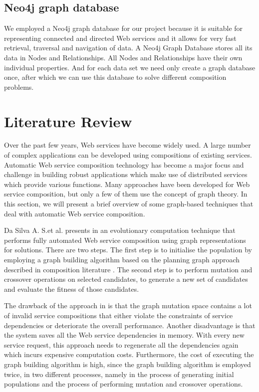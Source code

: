 \subsection{Neo4j graph database}
We employed a Neo4j \cite{6} graph database for our project because it is suitable for representing connected and directed Web services and it allows for very fast retrieval, traversal and navigation of data. A Neo4j Graph Database stores all its data in Nodes and Relationships. All Nodes and Relationships have their own individual properties. And for each data set we need only create a graph database once, after which we can use this database to solve different composition problems. \par

\section{Literature Review}
Over the past few years, Web services have become widely used. A large number of complex applications can be developed using compositions of existing services. Automatic Web service composition technology has become a major focus and challenge in building robust applications which make use of distributed services which provide various functions. Many approaches have been developed for Web service composition, but only a few of them use the concept of graph theory. In this section, we will present a brief overview of some graph-based techniques that deal with automatic Web service composition.\par
Da Silva A. S.et al. presents in \cite{2} an evolutionary computation technique that performs fully automated Web service composition using graph representations for solutions. There are two steps. The first step is to initialise the population by employing a graph building algorithm based on the planning graph approach described in composition literature \cite{3}. The second step is to perform mutation and crossover operations on selected candidates, to generate a new set of candidates and evaluate the fitness of those candidates.\par
The drawback of the approach in \cite{2} is that the graph mutation space contains a lot of invalid service compositions that either violate the constraints of service dependencies or deteriorate the overall performance. Another disadvantage is that the system saves all the Web service dependencies in memory. With every new service request, this approach needs to regenerate all the dependencies again which incurs expensive computation costs. Furthermore, the cost of executing the graph building algorithm is high, since the graph building algorithm is employed twice, in two different processes, namely in the process of generating initial populations and the process of performing mutation and crossover operations.\par
